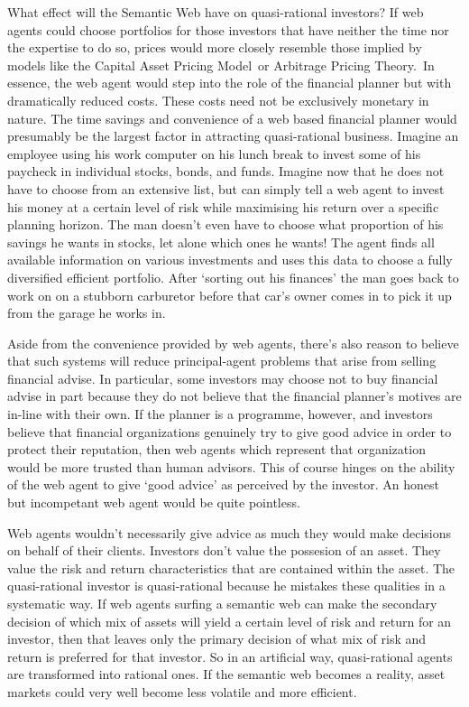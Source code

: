 \documentclass{ucthesis}
\begin{document}
What effect will the Semantic Web have on quasi-rational investors? If web
agents could choose portfolios for those investors that have neither the
time nor the expertise to do so, prices would more closely resemble those
implied by models like the Capital Asset Pricing Model\ or Arbitrage Pricing
Theory.\ In essence, the web agent would step into the role of the financial
planner but with dramatically reduced costs. These costs need not be
exclusively monetary in nature. The time savings and convenience of a web
based financial planner would presumably be the largest factor in attracting
quasi-rational business. Imagine an employee using his work computer on his
lunch break to invest some of his paycheck in individual stocks, bonds, and
funds. Imagine now that he does not have to choose from an extensive list,
but can simply tell a web agent to invest his money at a certain level of
risk while maximising his return over a specific planning horizon. The man
doesn't even have to choose what proportion of his savings he wants in
stocks, let alone which ones he wants! The agent finds all available
information on various investments and uses this data to choose a fully
diversified efficient portfolio. After `sorting out his finances' the man
goes back to work on on a stubborn carburetor before that car's owner comes
in to pick it up from the garage he works in.

Aside from the convenience provided by web agents, there's also reason to
believe that such systems will reduce principal-agent problems that arise
from selling financial advise. In particular, some investors may choose not
to buy financial advise in part because they do not believe that the
financial planner's motives are in-line with their own. If the planner is a
programme, however, and investors believe that financial organizations
genuinely try to give good advice in order to protect their reputation, then
web agents which represent that organization would be more trusted than
human advisors. This of course hinges on the ability of the web agent to
give `good advice' as perceived by the investor. An honest but incompetant
web agent would be quite pointless.

Web agents wouldn't necessarily give advice as much they would make
decisions on behalf of their clients. Investors don't value the possesion of
an asset. They value the risk and return characteristics that are contained
within the asset. The quasi-rational investor is quasi-rational because he
mistakes these qualities in a systematic way. If web agents surfing a
semantic web can make the secondary decision of which mix of assets will
yield a certain level of risk and return for an investor, then that leaves
only the primary decision of what mix of risk and return is preferred for
that investor. So in an artificial way, quasi-rational agents are
transformed into rational ones. If the semantic web becomes a reality, asset
markets could very well become less volatile and more efficient.
\end{document}
